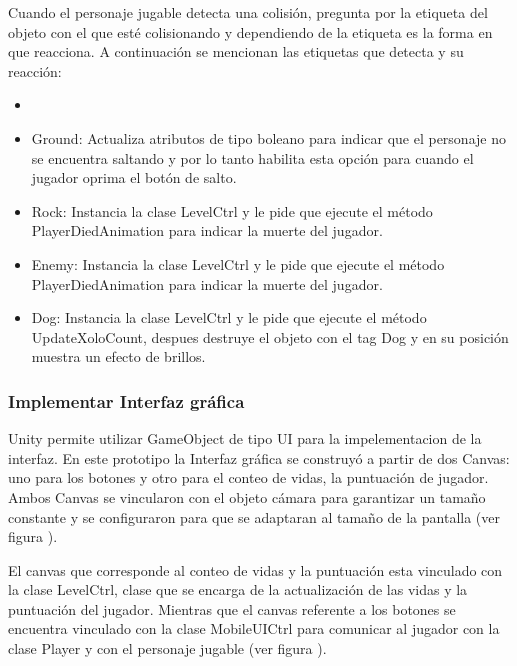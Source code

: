 Cuando el personaje jugable detecta una colisión, pregunta por la etiqueta del 
objeto con el que esté colisionando y dependiendo de la etiqueta es la forma 
en que reacciona. A continuación se mencionan las etiquetas que detecta y su 
reacción:
\begin{itemize}
	\item \item Ground: Actualiza atributos de tipo boleano para indicar que el 
	personaje no se encuentra saltando y por lo tanto habilita esta opción para 
	cuando el jugador oprima el botón de salto.
	\item Rock: Instancia la clase LevelCtrl y le pide que ejecute el método 
	PlayerDiedAnimation para indicar la muerte del jugador.
	\item Enemy: Instancia la clase LevelCtrl y le pide que ejecute el método 
	PlayerDiedAnimation para indicar la muerte del jugador.
	\item Dog: Instancia la clase LevelCtrl y le pide que ejecute el método 
	UpdateXoloCount, despues destruye el objeto con el tag Dog y en su posición 
	muestra un efecto de brillos. 
\end{itemize} 

\subsubsection{Implementar Interfaz gráfica} 
Unity permite utilizar GameObject de tipo UI para la impelementacion de la interfaz.
En este prototipo la Interfaz gráfica se construyó a partir de dos Canvas: uno 
para los botones y otro para el conteo de vidas, la puntuación de jugador. 
Ambos Canvas se vincularon con el objeto cámara para garantizar un tamaño constante 
y se configuraron para que se adaptaran al tamaño de la pantalla (ver figura ).    
 \\
 \par
 El canvas que corresponde al conteo de vidas y la puntuación esta vinculado con 
 la clase LevelCtrl, clase que se encarga de la actualización de las vidas y la 
 puntuación del jugador. Mientras que el canvas referente a los botones se encuentra 
 vinculado con la clase MobileUICtrl para comunicar al jugador con la clase Player 
 y con el personaje jugable (ver figura ).  
 
